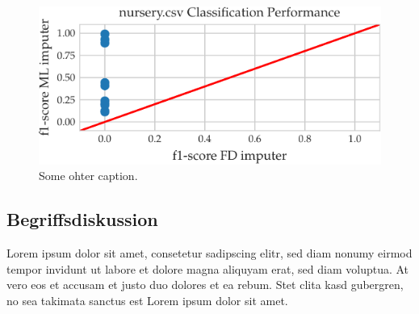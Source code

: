  \begin{figure}[h]
     \centering
     \includegraphics[width=.8\textwidth]{../figures/nursery/f1_ml_fd_nursery}
     \caption{Some ohter caption.}
     \label{fig:f1_ml_fd_nursery}
\end{figure}

\subsection{Begriffsdiskussion}
Lorem ipsum dolor sit amet, consetetur sadipscing elitr, sed diam nonumy eirmod
tempor invidunt ut labore et dolore magna aliquyam erat, sed diam voluptua. At
vero eos et accusam et justo duo dolores et ea rebum. Stet clita kasd gubergren,
no sea takimata sanctus est Lorem ipsum dolor sit amet.
